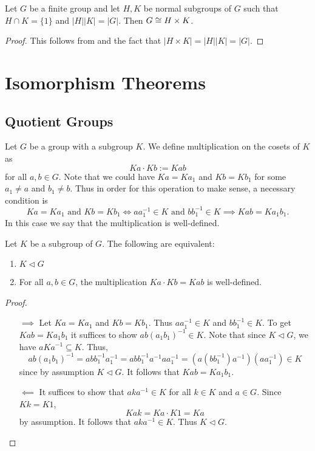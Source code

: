\documentclass[11pt]{article}
\begin{document}
\begin{corollary}
    Let $G$ be a finite group and let $H,K$ be normal subgroups of $G$ such that $H\cap K=\{1\}$ and $|H||K|=|G|$. Then $G\cong H\times K$.
\end{corollary}

\begin{proof}
    This follows from  and the fact that $|H\times K|=|H||K|=|G|$.
\end{proof}

\section{Isomorphism Theorems}

\subsection{Quotient Groups}

\begin{definition}
    Let $G$ be a group with a subgroup $K$. We define multiplication on the cosets of $K$ as
    \[Ka\cdot Kb:=Kab\]
    for all $a,b\in G$. Note that we could have $Ka=Ka_1$ and $Kb=Kb_1$ for some $a_1\neq a$ and $b_1\neq b$. Thus in order for this operation to make sense, a necessary condition is
    \[Ka=Ka_1\text{ and }Kb=Kb_1\iff aa_1^{-1}\in K\text{ and }bb_1^{-1}\in K\implies Kab=Ka_1b_1.\]
    In this case we say that the multiplication is well-defined.
\end{definition}

\begin{lemma}
    Let $K$ be a subgroup of $G$. The following are equivalent:
    \begin{enumerate}
        \item $K\lhd G$
        \item For all $a,b\in G$, the multiplication $Ka\cdot Kb=Kab$ is well-defined.
    \end{enumerate}
\end{lemma}

\begin{proof}\,
    \begin{itemize}
        \item[$\implies$] Let $Ka=Ka_1$ and $Kb=Kb_1$. Thus $aa_1^{-1}\in K$ and $bb_1^{-1}\in K$. To get $Kab=Ka_1b_1$ it suffices to show $ab(a_1b_1)^{-1}\in K$. Note that since $K\lhd G$, we have $aKa^{-1}\subseteq K$. Thus,
        \[ab(a_1b_1)^{-1}=abb_1^{-1}a_1^{-1}=abb_1^{-1}a^{-1}aa_1^{-1}=(a(bb_1^{-1})a^{-1})(aa_1^{-1})\in K\]
        since by assumption $K\lhd G$. It follows that $Kab=Ka_1b_1$.
        \item[$\impliedby$] It suffices to show that $aka^{-1}\in K$ for all $k\in K$ and $a\in G$. Since $Kk=K1$,
        \[Kak=Ka\cdot K1=Ka\]
        by assumption. It follows that $aka^{-1}\in K$. Thus $K\lhd G$.
    \end{itemize}
\end{proof}
\end{document}
